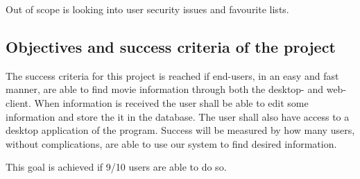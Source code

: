 Out of scope is looking into user security issues and favourite lists.


\subsection{Objectives and success criteria of the project}

The success criteria for this project is reached if end-users, in an easy and fast manner, are able to find movie information through both the desktop- and web-client. When information is received the user shall be able to edit some information and store the it in the database. The user shall also have access to a desktop application of the program. Success will be measured by how many users, without complications, are able to use our system to find desired information.

This goal is achieved if 9/10 users are able to do so.


